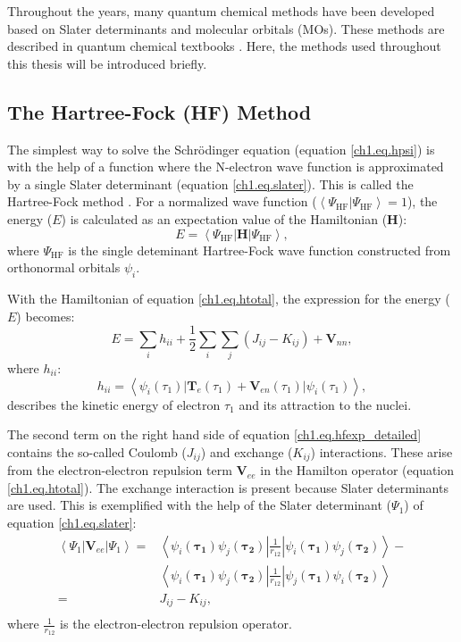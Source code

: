 Throughout the years, many quantum chemical methods have been developed based on Slater determinants and molecular orbitals (MOs). These methods are described in quantum chemical textbooks \cite{szabo}. Here, the methods used throughout this thesis will be introduced briefly.

\subsection{The Hartree-Fock (HF) Method}
The simplest way to solve the Schr\"{o}dinger equation (equation \ref{ch1.eq.hpsi}) is with the help of a function where the N-electron wave function is approximated by a single Slater determinant (equation \ref{ch1.eq.slater}). This is called the Hartree-Fock method \cite{hartree1,hartree2,hartree3,fock}. For a normalized wave function ($\left< \Psi_\mathrm{HF} | \Psi_\mathrm{HF} \right> = 1$), the energy ($E$) is calculated as an expectation value of the Hamiltonian ($\mathbf{H}$):
\begin{equation}
E=\left< \Psi_\mathrm{HF} | \mathbf{H} | \Psi_\mathrm{HF} \right>,
\label{ch1.eq.hfexp}
\end{equation}
where $\Psi_\mathrm{HF}$ is the single deteminant Hartree-Fock wave function constructed from orthonormal orbitals $\psi_i$.

With the Hamiltonian of equation \ref{ch1.eq.htotal}, the expression for the energy ($E$) becomes:
\begin{equation}
E=\sum_i h_{ii} + \frac{1}{2} \sum_i\sum_j (J_{ij} - K_{ij}) + \mathbf{V}_{nn},
\label{ch1.eq.hfexp_detailed}
\end{equation}
where $h_{ii}$:
\begin{equation}
h_{ii} = \left< \psi_i(\tau_1) | \mathbf{T}_{e}(\tau_1) + \mathbf{V}_{en}(\tau_1) | \psi_i(\tau_1)\right>,
\end{equation}
describes the kinetic energy of electron $\tau_1$ and its attraction to the nuclei.

The second term on the right hand side of equation \ref{ch1.eq.hfexp_detailed} contains the so-called Coulomb ($J_{ij}$) and exchange ($K_{ij}$) interactions. These arise from the electron-electron repulsion term $\mathbf{V}_{ee}$ in the Hamilton operator (equation \ref{ch1.eq.htotal}). The exchange interaction is present because Slater determinants are used. This is exemplified with the help of the Slater determinant ($\Psi_1$) of equation \ref{ch1.eq.slater}:
\begin{equation}
\begin{split}
\left< \Psi_1 | \mathbf{V}_{ee} | \Psi_1 \right> = & \left< \psi_i(\mathbf{\tau_1})\psi_j(\mathbf{\tau_2}) | \frac{1}{r_{12}} | \psi_i(\mathbf{\tau_1})\psi_j(\mathbf{\tau_2}) \right> - \\
& \left< \psi_i(\mathbf{\tau_1})\psi_j(\mathbf{\tau_2}) | \frac{1}{r_{12}} | \psi_j(\mathbf{\tau_1})\psi_i(\mathbf{\tau_2}) \right> \\
= & J_{ij} - K_{ij}, \\
\end{split}
\end{equation}
where $\frac{1}{r_{12}}$ is the electron-electron repulsion operator.

